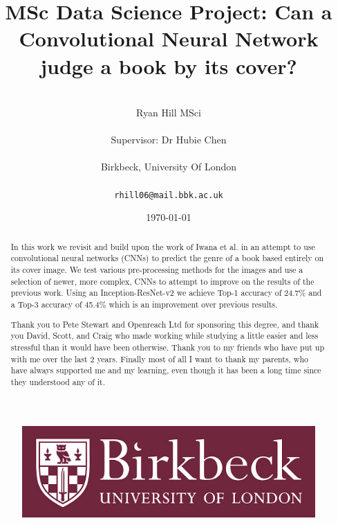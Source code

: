 \documentclass[12pt]{article}
\numberwithin{equation}{section}
\numberwithin{figure}{section}
\begin{document}
\renewcommand\citeform[1]{[#1]}
%
\title{MSc Data Science Project: Can a Convolutional Neural Network judge a book by its cover?}
\author{\\Ryan Hill MSci\\\\
Supervisor: Dr Hubie Chen\\\\
Birkbeck, University Of London\\\\
\texttt{rhill06@mail.bbk.ac.uk}}
\date{\today}
\maketitle
\thispagestyle{empty}
\graphicspath{{images/}}
\begin{abstract}
	In this work we revisit and build upon the work of Iwana et al.\cite{KenjiIwana} in an attempt to use convolutional neural networks (CNNs) to predict the genre of a book based entirely on its cover image. We test various pre-processing methods for the images and use a selection of newer, more complex, CNNs to attempt to improve on the results of the previous work. Using an Inception-ResNet-v2 we achieve Top-1 accuracy of 24.7\% and a Top-3 accuracy of 45.4\% which is an improvement over previous results.
\end{abstract}
\renewcommand{\abstractname}{Acknowledgements}
\begin{abstract}
Thank you to Pete Stewart and Openreach Ltd for sponsoring this degree, and thank you David, Scott, and Craig who made working while studying a little easier and less stressful than it would have been otherwise. Thank you to my friends who have put up with me over the last 2 years. Finally most of all I want to thank my parents, who have always supported me and my learning, even though it has been a long time since they understood any of it. 
\end{abstract}

\begin{figure}[!b]
	\centering
	\includegraphics[scale=0.4]{bbk_logo.jpg}
\end{figure}
\end{document}
